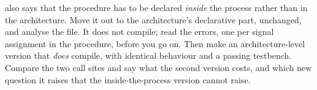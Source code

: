   also says that the procedure has to be declared \emph{inside} the
process rather than in the architecture. Move it out to the architecture's declarative part,
unchanged, and analyse the file. It does not compile; read the errors, one per signal assignment in
the procedure, before you go on. Then make an architecture-level version that \emph{does} compile,
with identical behaviour and a passing testbench. Compare the two call sites and say what the second
version costs, and which new question it raises that the inside-the-process version cannot raise.
